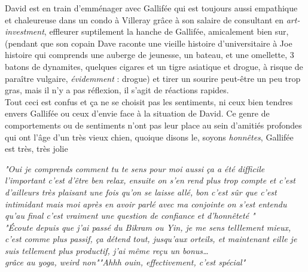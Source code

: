 \documentclass{article}
\begin{document}
 \setlength{\columnsep}{4em}
\begin{paracol}{2}
\begin{rightcolumn}
    David est en train d'emménager avec Gallifée qui est toujours aussi
    empathique et chaleureuse dans un condo à Villeray grâce à son salaire de
    consultant en \textit{art-investment}, effleurer suptilement la hanche de
    Gallifée, amicalement bien sur, (pendant que son copain Dave raconte une
    vieille histoire d'universitaire à Joe histoire qui comprends une auberge de
    jeunesse, un bateau, et une omellette, 3 batons de dynamites, quelques
    cigares et un tigre asiatique et drogue, à risque de paraître vulgaire,
    \emph{évidemment} : drogue) et tirer un sourire peut-être un peu trop gras,
    mais il n'y a pas réflexion, il s'agit de réactions rapides. \\

    Tout ceci est confus et ça ne se choisit pas les sentiments, ni ceux bien
    tendres envers Gallifée ou ceux d'envie face à la situation de David. Ce
    genre de comportements ou de sentiments n'ont pas leur place au sein
    d'amitiés profondes qui ont l'âge d'un très vieux chien, quoique disons le,
    soyons \emph{honnêtes}, Gallifée est très, très jolie\\
\end{rightcolumn}

\begin{leftcolumn}
     \phantom{}
    \small
    \textit{"Oui je comprends comment tu te sens pour moi aussi ça a été
        difficile l'important c'est d'être ben relax, ensuite on s'en rend
        plus trop compte et c'est d'ailleurs très plaisant une fois qu'on
        se laisse allé, bon c'est sûr que c'est intimidant mais moi après
        en avoir parlé avec ma conjointe on s'est entendu qu'au final
        c'est vraiment une question de confiance et d'honnêteté
        \textelp{}"}\\

    \textit{"Écoute depuis que j'ai passé du Bikram ou Yin, je me sens
        telllement mieux, c'est comme plus passif, ça détend tout,
        jusqu'aux orteils, et maintenant eille je suis tellement plus
        productif, j'ai même reçu un bonus\ldots\\grâce au yoga, weird
        non""Ahhh ouin, effectivement, c'est spécial"}
\end{leftcolumn}
\end{paracol}
\clearpage
\end{document}
